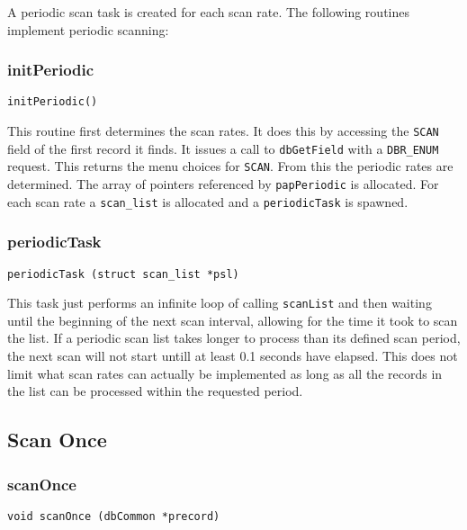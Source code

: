 A periodic scan task is created for each scan rate. The following routines implement periodic scanning:

\subsubsection{initPeriodic}

\begin{verbatim}
initPeriodic()
\end{verbatim}

This routine first determines the scan rates. It does this by accessing the \verb|SCAN| field of the first record it finds. It issues a 
call to \verb|dbGetField| with a \verb|DBR_ENUM| request. This returns the menu choices for \verb|SCAN|. From this the periodic rates are 
determined. The array of pointers referenced by \verb|papPeriodic| is allocated. For each scan rate a \verb|scan_list| is 
allocated and a \verb|periodicTask| is spawned.

\subsubsection{periodicTask}

\begin{verbatim}
periodicTask (struct scan_list *psl)
\end{verbatim}

This task just performs an infinite loop of calling \verb|scanList| and then waiting until the beginning of the next scan 
interval, allowing for the time it took to scan the list. If a periodic scan list takes longer to process than its defined scan 
period, the next scan will not start untill at least 0.1 seconds have elapsed.  This does not limit what scan rates can actually 
be implemented as long as all the records in the list can be processed within the requested period.

\subsection{Scan Once}

\subsubsection{scanOnce}

\begin{verbatim}
void scanOnce (dbCommon *precord)
\end{verbatim}

